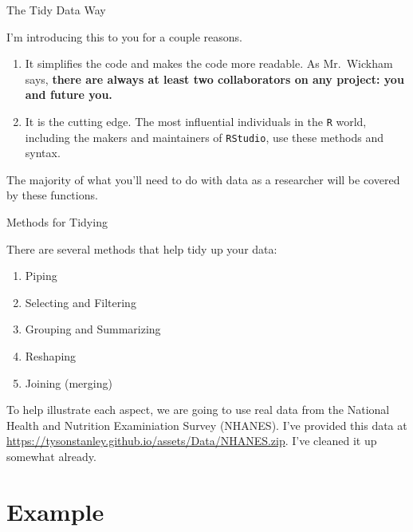\begin{frame}[fragile]{The Tidy Data Way}

I'm introducing this to you for a couple reasons.

\begin{enumerate}
\def\labelenumi{\arabic{enumi}.}
\tightlist
\item
  It simplifies the code and makes the code more readable. As
  Mr.~Wickham says, \textbf{there are always at least two collaborators
  on any project: you and future you.}
\item
  It is the cutting edge. The most influential individuals in the
  \texttt{R} world, including the makers and maintainers of
  \texttt{RStudio}, use these methods and syntax.
\end{enumerate}

The majority of what you'll need to do with data as a researcher will be
covered by these functions.

\end{frame}

\begin{frame}{Methods for Tidying}

There are several methods that help tidy up your data:

\begin{enumerate}
\def\labelenumi{\arabic{enumi}.}
\tightlist
\item
  Piping
\item
  Selecting and Filtering
\item
  Grouping and Summarizing
\item
  Reshaping
\item
  Joining (merging)
\end{enumerate}

To help illustrate each aspect, we are going to use real data from the
National Health and Nutrition Examiniation Survey (NHANES). I've
provided this data at
\url{https://tysonstanley.github.io/assets/Data/NHANES.zip}. I've
cleaned it up somewhat already.

\end{frame}

\section{Example}\label{example}

